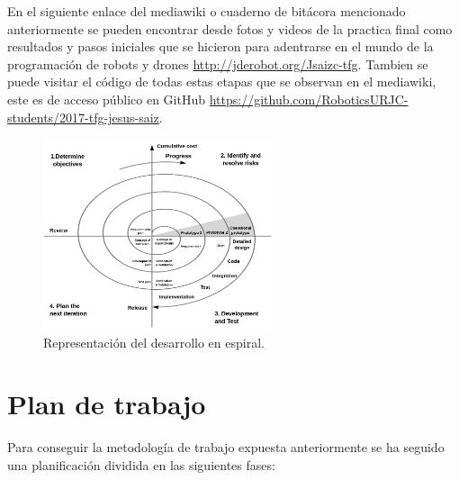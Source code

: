 \hspace{1cm} En el siguiente enlace del mediawiki o cuaderno de bitácora mencionado anteriormente se pueden encontrar desde fotos y videos de la practica final como resultados y pasos iniciales que se hicieron para adentrarse en el mundo de la programación de robots y drones \href{http://jderobot.org/Jsaizc-tfg}{http://jderobot.org/Jsaizc-tfg}. Tambien se puede visitar el código de todas estas etapas que se observan en el mediawiki, este es de acceso público en GitHub \href{https://github.com/RoboticsURJC-students/2017-tfg-jesus-saiz}{https://github.com/RoboticsURJC-students/2017-tfg-jesus-saiz}.

\begin{figure}[H]
	\begin{center}
		\includegraphics[width=0.6\textwidth]{imag/IMG17.png}
				\caption{Representación del desarrollo en espiral.} 
	\label{fig:Desarrollo en espiral.}	
	\end{center}
\end{figure}


\section{Plan de trabajo}
\hspace{1cm} Para conseguir la metodología de trabajo expuesta anteriormente se ha seguido una planificación dividida en las siguientes fases:

